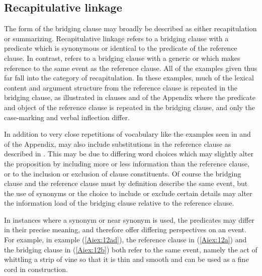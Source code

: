 \documentclass[output=paper]{LSP/langsci}
\begin{document}
\subsection{Recapitulative linkage} 
\label{AiRecapitulative}
The form of the bridging clause may broadly be described as either recapitulation or summarizing. Recapitulative linkage refers to a bridging clause with a predicate which is synonymous or identical to the predicate of the reference clause. In contrast,  refers to a bridging clause with a generic or  which makes reference to the same event as the reference clause. All of the examples given thus far fall into the category of recapitulation. In these examples, much of the lexical content and argument structure from the reference clause is repeated in the bridging clause, as illustrated in clauses  and  of the Appendix where the predicate and object of the reference clause is repeated in the bridging clause, and only the case-marking and verbal inflection differ.

In addition to very close repetitions of vocabulary like the examples seen in  and  of the Appendix,  may also include substitutions in the reference clause as described in . This may be due to differing word choices which may slightly alter the proposition by including more or less information than the reference clause, or to the inclusion or exclusion of clause constituents. Of course the bridging clause and the reference clause must by definition describe the same event, but the use of synonyms or the choice to include or exclude certain details may alter the information load of the bridging clause relative to the reference clause.

In instances where a synonym or near synonym is used, the predicates may differ in their precise meaning, and therefore offer differing perspectives on an event. For example, in example (\ref{Aiex:12ad}), the reference clause in (\ref{Aiex:12a}) and the bridging clause in (\ref{Aiex:12b}) both refer to the same event, namely the act of whittling a strip of vine so that it is thin and smooth and can be used as a fine cord in construction.
\end{document}
